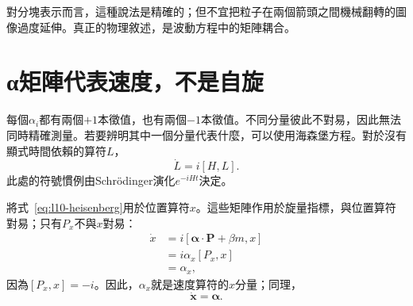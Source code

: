 \begin{classroomqa}
\end{classroomqa}

對分塊表示而言，這種說法是精確的；但不宜把粒子在兩個箭頭之間機械翻轉的圖像過度延伸。真正的物理敘述，是波動方程中的矩陣耦合。

\begin{classroomqa}
\end{classroomqa}

\begin{classroomqa}
\end{classroomqa}

\section{{\proseunicodefont α}矩陣代表速度，不是自旋}

每個\(\alpha_i\)都有兩個\(+1\)本徵值，也有兩個\(-1\)本徵值。不同分量彼此不對易，因此無法同時精確測量。若要辨明其中一個分量代表什麼，可以使用海森堡方程。對於沒有顯式時間依賴的算符\(L\)，
\begin{equation}
\dot L=i[H,L].
\label{eq:l10-heisenberg}
\end{equation}
此處的符號慣例由Schr\"odinger演化\(e^{-iHt}\)決定。

將式~\eqref{eq:l10-heisenberg}用於位置算符\(x\)。這些矩陣作用於旋量指標，與位置算符對易；只有\(P_x\)不與\(x\)對易：
\begin{align}
\dot x
&=i[\boldsymbol{\alpha}\cdot\mathbf P+\beta m,x]\\
&=i\alpha_x[P_x,x]\\
&=\alpha_x,
\label{eq:l10-velocity}
\end{align}
因為\([P_x,x]=-i\)。因此，\(\alpha_x\)就是速度算符的\(x\)分量；同理，
\begin{equation}
\dot{\mathbf x}=\boldsymbol{\alpha}.
\end{equation}

